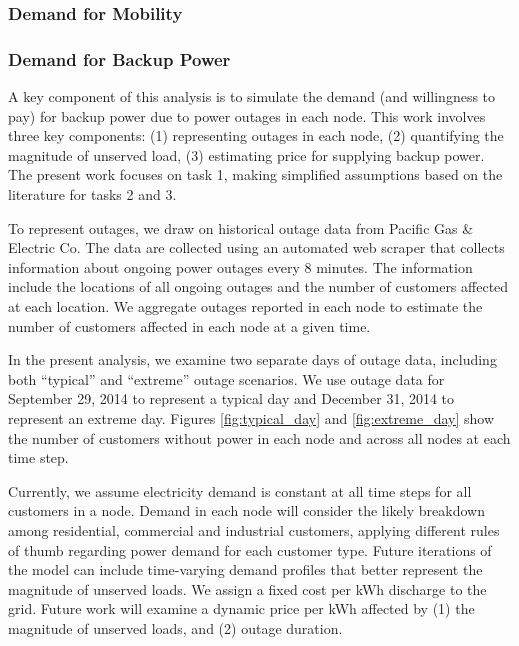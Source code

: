 \documentclass[journal]{IEEEtran}
\begin{document}
\subsubsection{Demand for Mobility}

\subsubsection{Demand for Backup Power}
A key component of this analysis is to simulate the demand (and willingness to pay) for backup power due to power outages in each node. This work involves three key components: (1) representing outages in each node, (2) quantifying the magnitude of unserved load, (3) estimating price for supplying backup power. The present work focuses on task 1, making simplified assumptions based on the literature for tasks 2 and 3. 

To represent outages, we draw on historical outage data from Pacific Gas \& Electric Co. The data are collected using an automated web scraper that collects information about ongoing power outages every 8 minutes. The information include the locations of all ongoing outages and the number of customers affected at each location. We aggregate outages reported in each node to estimate the number of customers affected in each node at a given time.

In the present analysis, we examine two separate days of outage data, including both ``typical'' and ``extreme'' outage scenarios. We use outage data for September 29, 2014 to represent a typical day and December 31, 2014 to represent an extreme day. Figures \ref{fig:typical_day} and \ref{fig:extreme_day} show the number of customers without power in each node and across all nodes at each time step.

Currently, we assume electricity demand is constant at all time steps for all customers in a node. Demand in each node will consider the likely breakdown among residential, commercial and industrial customers, applying different rules of thumb regarding power demand for each customer type. Future iterations of the model can include time-varying demand profiles that better represent the magnitude of unserved loads. We assign a fixed cost per kWh discharge to the grid. Future work will examine a dynamic price per kWh affected by (1) the magnitude of unserved loads, and (2) outage duration.
\end{document}
